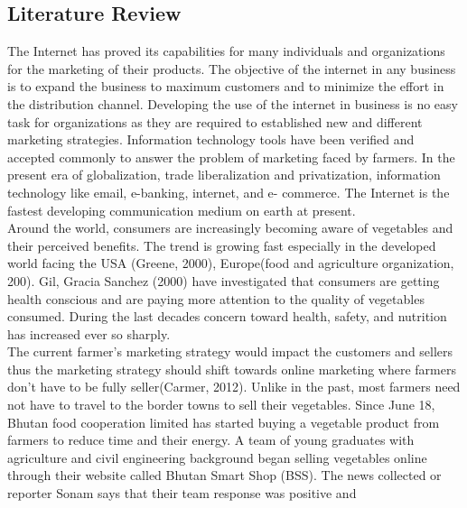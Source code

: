 \documentclass[12pt]{report}
\begin{document}
\begin{normalsize}

		
\chapter{Literature Review}			

The Internet has proved its capabilities for many individuals and organizations for the marketing
of their products. The objective of the internet in any business is to expand the business to
maximum customers and to minimize the effort in the distribution channel. Developing the use of
the internet in business is no easy task for organizations as they are required to established new
and different marketing strategies. Information technology tools have been verified and accepted
commonly to answer the problem of marketing faced by farmers. In the present era of globalization,
trade liberalization and privatization, information technology like email, e-banking, internet, and
e- commerce. The Internet is the fastest developing communication medium on earth at present.\newline\\[0.1cm]
Around the world, consumers are increasingly becoming aware of vegetables and their perceived
benefits. The trend is growing fast especially in the developed world facing the USA \cite{key1} (Greene, 2000),
Europe(food and agriculture organization, 200). \cite{key2}Gil, Gracia Sanchez (2000) have investigated that
consumers are getting health conscious and are paying more attention to the quality of vegetables
consumed. During the last decades concern toward health, safety, and nutrition has increased ever
so sharply.\newline\\[0.1cm]
The current farmer's marketing strategy would impact the customers and sellers thus the marketing strategy should shift towards online marketing where farmers don't have to be fully seller\cite{key3}(Carmer, 2012).
Unlike in the past, most farmers need not have to travel to the border towns to sell their vegetables.
Since June 18, Bhutan food cooperation limited has started buying a vegetable product from farmers
to reduce time and their energy. A team of young graduates with agriculture and civil engineering
background began selling vegetables online through their website called Bhutan Smart Shop \cite{key4}(BSS).
The news collected or reporter Sonam says that their team response was positive and

\end{normalsize}
\end{document}
